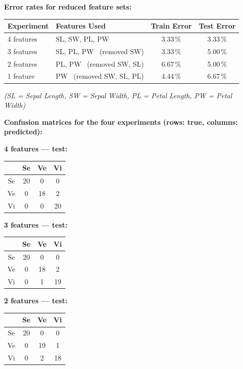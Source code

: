 \documentclass[11pt,a4paper]{article}
\begin{document}
\bigskip
\noindent\textbf{Error rates for reduced feature sets:}
\begin{center}
\begin{tabular}{llcc}
\toprule
Experiment & Features Used & Train Error & Test Error \\
\midrule
4 features & SL, SW, PL, PW                     & 3.33\,\% & 3.33\,\% \\
3 features & SL, PL, PW \ (removed SW)          & 3.33\,\% & 5.00\,\% \\
2 features & PL, PW     \ (removed SW, SL)      & 6.67\,\% & 5.00\,\% \\
1 feature  & PW         \ (removed SW, SL, PL)  & 4.44\,\% & 6.67\,\% \\
\bottomrule
\end{tabular}
\end{center}
\textit{(SL = Sepal Length, SW = Sepal Width, PL = Petal Length, PW = Petal Width)}

\bigskip
\noindent\textbf{Confusion matrices for the four experiments (rows: true, columns: predicted):}

\bigskip
\noindent\textbf{4 features --- test:}
\begin{center}\begin{tabular}{c|ccc}\toprule
 & Se & Ve & Vi \\ \midrule
Se & 20 & 0 & 0 \\
Ve & 0 & 18 & 2 \\
Vi & 0 & 0 & 20 \\
\bottomrule\end{tabular}\end{center}

\noindent\textbf{3 features --- test:}
\begin{center}\begin{tabular}{c|ccc}\toprule
 & Se & Ve & Vi \\ \midrule
Se & 20 & 0 & 0 \\
Ve & 0 & 18 & 2 \\
Vi & 0 & 1 & 19 \\
\bottomrule\end{tabular}\end{center}

\noindent\textbf{2 features --- test:}
\begin{center}\begin{tabular}{c|ccc}\toprule
 & Se & Ve & Vi \\ \midrule
Se & 20 & 0 & 0 \\
Ve & 0 & 19 & 1 \\
Vi & 0 & 2 & 18 \\
\bottomrule\end{tabular}\end{center}
\end{document}
